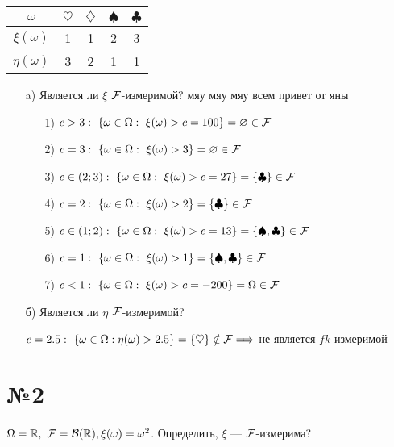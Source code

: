 \documentclass[a4paper, 10pt]{article}
\begin{document}
\begin{table}[h]
    \begin{tabular}{|c|c|c|c|c|}
        \hline
        $\omega$ & $\heartsuit$ & $\diamondsuit$ & $\spadesuit$  & $\clubsuit$\\
        \hline
        $\xi(\omega)$ & 1 & 1 & 2 & 3\\
        \hline
        $\eta(\omega)$ & 3 & 2 & 1 & 1\\
        \hline
        
    \end{tabular}
\end{table}
\begin{itemize}
    \item[a)] Является ли $\xi$ $\mathcal{F}$-измеримой? мяу мяу мяу всем привет от яны
    \begin{itemize}
        \item[1)] $c>3:\ \{\omega\in\Omega:\ \xi(\omega)>c=100\}=\varnothing\in\fk$
        \item[2)] $c=3:\ \{\omega\in\Omega:\ \xi(\omega)>3\}=\varnothing\in\fk$
        \item[3)] $c\in(2;3):\ \{\omega\in\Omega:\ \xi(\omega)>c=27\}=\{\clubsuit\}\in\fk$ 
        \item[4)] $c=2:\ \{\omega\in\Omega:\ \xi(\omega)>2\}=\{\clubsuit\}\in\fk$  
        \item[5)] $c\in(1;2):\ \{\omega\in\Omega:\ \xi(\omega)>c=13\}=\{\spadesuit,\clubsuit\}\in\fk$
        \item[6)] $c=1:\ \{\omega\in\Omega:\ \xi(\omega)>1\}=\{\spadesuit,\clubsuit\}\in\fk$  
        \item[7)] $c<1:\ \{\omega\in\Omega:\ \xi(\omega)>c=-200\}=\Omega\in\fk$ 
    \end{itemize}
    \item[б)] Является ли $\eta$ $\mathcal{F}$-измеримой?
    
    $c=2.5:\ \{\omega\in\Omega:\eta(\omega)>2.5\}=\{\heartsuit\}\notin\fk\Longrightarrow$ не является $fk$-измеримой 
\end{itemize}

\section*{№2}
$\Omega=\mathbb{R},\ \fk=\mathcal{B}(\mathbb{R}),\xi(\omega)=\omega^2$. Определить, $\xi$ — $\mathcal{F}$-измерима?
\end{document}
